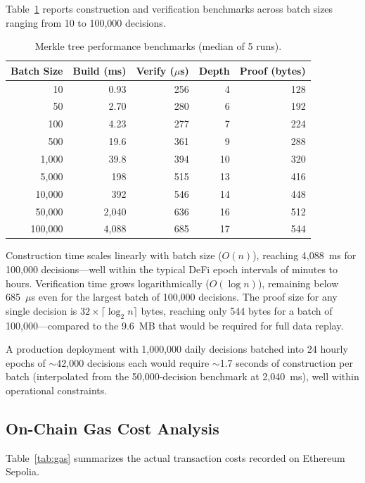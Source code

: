 \documentclass[manuscript,nonacm]{acmart}
\begin{document}
Table~\ref{tab:performance} reports construction and verification benchmarks across batch sizes ranging from 10 to 100,000 decisions.

\begin{table}[t]
\centering
\caption{Merkle tree performance benchmarks (median of 5 runs).}
\label{tab:performance}
\begin{tabular}{@{}rrrrr@{}}
\toprule
\textbf{Batch Size} & \textbf{Build (ms)} & \textbf{Verify ($\mu$s)} & \textbf{Depth} & \textbf{Proof (bytes)} \\
\midrule
10     & 0.93   & 256   & 4  & 128  \\
50     & 2.70   & 280   & 6  & 192  \\
100    & 4.23   & 277   & 7  & 224  \\
500    & 19.6   & 361   & 9  & 288  \\
1,000  & 39.8   & 394   & 10 & 320  \\
5,000  & 198    & 515   & 13 & 416  \\
10,000 & 392    & 546   & 14 & 448  \\
50,000 & 2,040  & 636   & 16 & 512  \\
100,000 & 4,088 & 685   & 17 & 544  \\
\bottomrule
\end{tabular}
\end{table}

Construction time scales linearly with batch size ($O(n)$), reaching 4,088~ms for 100,000 decisions---well within the typical DeFi epoch intervals of minutes to hours.
Verification time grows logarithmically ($O(\log n)$), remaining below 685~$\mu$s even for the largest batch of 100,000 decisions.
The proof size for any single decision is $32 \times \lceil \log_2 n \rceil$ bytes, reaching only 544 bytes for a batch of 100,000---compared to the 9.6~MB that would be required for full data replay.

A production deployment with 1,000,000 daily decisions batched into 24 hourly epochs of ${\sim}$42,000 decisions each would require ${\sim}$1.7 seconds of construction per batch (interpolated from the 50,000-decision benchmark at 2,040~ms), well within operational constraints.

\subsection{On-Chain Gas Cost Analysis}

Table~\ref{tab:gas} summarizes the actual transaction costs recorded on Ethereum Sepolia.
\end{document}
